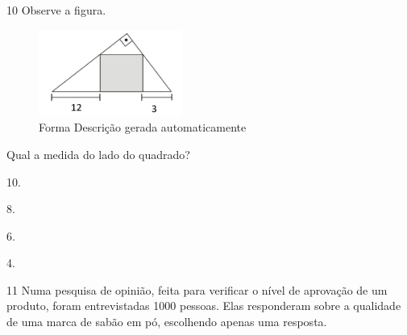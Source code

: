 {{{\begin{escolha}
{{{{{\begin{escolha}
\begin{escolha}
{\begin{q°}
{\begin{escolha}
\begin{escolha}
\begin{escolha}
\begin{escolha}
\begin{escolha}
\begin{escolha}
{{\num{10} Observe a figura.

\begin{figure}
\centering
\includegraphics[width=1.85417in,height=1.11601in]{./_SAEB_9_MAT/media/image272.png}
\caption{Forma Descrição gerada automaticamente}
\end{figure}

Qual a medida do lado do quadrado?

\begin{escolha}

  \item 10.

  \item 8.

  \item 6.

  \item 4.

\end{escolha}


\num{11} Numa pesquisa de opinião, feita para verificar o nível de aprovação
de um produto, foram entrevistadas 1000 pessoas. Elas responderam sobre a
qualidade de uma marca de sabão em pó, escolhendo apenas uma
resposta.

}}
\end{escolha}
\end{escolha}
\end{escolha}
\end{escolha}
\end{escolha}
\end{escolha}}
\end{q°}}
\end{escolha}
\end{escolha}}}}}}
\end{escolha}}}}
